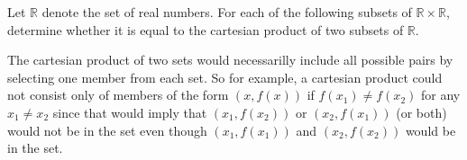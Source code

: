 \documentclass[../main.tex]{subfiles}
\begin{document}
\problem{}
Let \(\mathbb{R}\) denote the set of real numbers. For each of the following
subsets of \(\mathbb{R}\times\mathbb{R}\), determine whether it is equal to the
cartesian product of two subsets of \(\mathbb{R}\).

\begin{remark}
	The cartesian product of two sets would necessarilly include all
	possible pairs by selecting one member from each set. So for example, a
	cartesian product could not consist only of members of the form
	\((x, f(x))\) if \(f(x_1) \neq f(x_2)\) for any \(x_1 \neq x_2\) since
	that would imply that \((x_1, f(x_2))\) or \((x_2, f(x_1))\) (or both)
	would not be in the set even though \((x_1, f(x_1))\) and
	\((x_2, f(x_2))\) would be in the set.
\end{remark}






\end{document}
